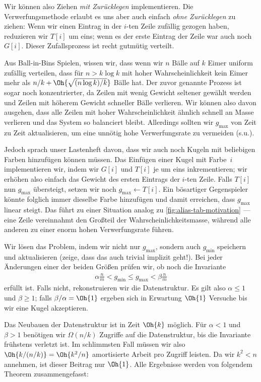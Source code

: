 Wir können also Ziehen \emph{mit Zurücklegen} implementieren.
Die Verwerfungsmethode erlaubt es uns aber auch einfach \emph{ohne Zurücklegen} zu ziehen:
Wenn wir einen Eintrag in der $i$-ten Zeile zufällig gezogen haben, reduzieren wir $T[i]$ um eins;
wenn es der erste Eintrag der Zeile war auch noch $G[i]$.
Dieser Zufallsprozess ist recht gutmütig verteilt.

Aus Ball-in-Bins Spielen, wissen wir, dass wenn wir $n$ Bälle auf $k$ Eimer uniform zufällig verteilen, dass für $n > k \log k$ mit hoher Wahrscheinlichkeit kein Eimer mehr als $n/k +\Oh{\sqrt{(n\log k) / k}}$ Bälle hat.
Der zuvor genannte Prozess ist sogar noch konzentrierter, da Zeilen mit wenig Gewicht seltener gewählt werden und Zeilen mit höherem Gewicht schneller Bälle verlieren.
Wir können also davon ausgehen, dass alle Zeilen mit hoher Wahrscheinlichkeit ähnlich schnell an Masse verlieren und das System so balanciert bleibt.
Allerdings sollten wir $g_\text{max}$ von Zeit zu Zeit aktualisieren, um eine unnötig hohe Verwerfungsrate zu vermeiden (s.u.).

Jedoch sprach unser Lastenheft davon, dass wir auch noch Kugeln mit beliebigen Farben hinzufügen können müssen.
Das Einfügen einer Kugel mit Farbe~$i$ implementieren wir, indem wir $G[i]$ und $T[i]$ je um eins inkrementieren;
wir erhöhen also einfach das Gewicht des ersten Eintrags der $i$-ten Zeile.
Falls $T[i]$ nun $g_\text{max}$ übersteigt, setzen wir noch $g_\text{max} \gets T[i]$.
Ein bösartiger Gegenspieler könnte folglich immer dieselbe Farbe hinzufügen und damit erreichen, dass $g_\text{max}$ linear steigt.
Das führt zu einer Situation analog zu \cref{fig:alias-tab-motivation}
--- eine Zeile vereinnahmt den Großteil der Wahrscheinlichkeitsmasse, während alle anderen zu einer enorm hohen Verwerfungsrate führen.

Wir lösen das Problem, indem wir nicht nur $g_\text{max}$, sondern auch $g_\text{min}$ speichern und aktualisieren (zeige, dass das auch trivial implizit geht!).
Bei jeder Änderungen einer der beiden Größen prüfen wir, ob noch die Invariante
\begin{align}
    \alpha \frac n m < g_\text{min} \le g_\text{max} < \beta \frac n m
\end{align}
erfüllt ist.
Falls nicht, rekonstruieren wir die Datenstruktur.
Es gilt also $\alpha \le 1$ und $\beta \ge 1$; falls $\beta / \alpha = \Oh{1}$ ergeben sich in Erwartung $\Oh{1}$ Versuche bis wir eine Kugel akzeptieren.

Das Neubauen der Datenstruktur ist in Zeit $\Oh{k}$ möglich.
Für $\alpha < 1$ und $\beta > 1$ benötigen wir $\Omega(n / k)$ Zugriffe auf die Datenstruktur, bis die Invariante frühstens verletzt ist.
Im schlimmsten Fall müssen wir also $\Oh{k / (n / k)} = \Oh{k^2 / n}$ amortisierte Arbeit pro Zugriff leisten.
Da wir $k^2 < n$ annehmen, ist dieser Beitrag nur $\Oh{1}$.
Alle Ergebnisse werden von folgendem Theorem zusammengefasst:

